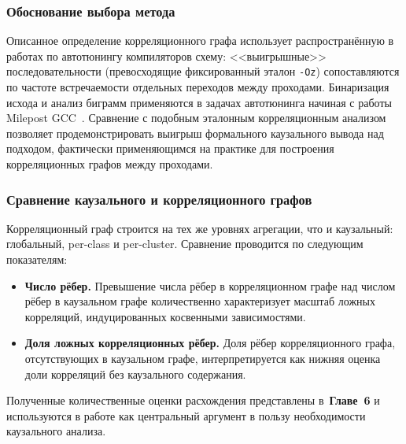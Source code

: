 \subsubsection{Обоснование выбора метода}

Описанное определение корреляционного графа использует распространённую в работах по автотюнингу компиляторов схему: <<выигрышные>> последовательности (превосходящие фиксированный эталон \texttt{-Oz}) сопоставляются по частоте встречаемости отдельных переходов между проходами. Бинаризация исхода и анализ биграмм применяются в задачах автотюнинга начиная с работы Milepost GCC~\cite{fursin2011milepost}. Сравнение с подобным эталонным корреляционным анализом позволяет продемонстрировать выигрыш формального каузального вывода над подходом, фактически применяющимся на практике для построения корреляционных графов между проходами.

\subsubsection{Сравнение каузального и корреляционного графов}

Корреляционный граф строится на тех же уровнях агрегации, что и каузальный: глобальный, per-class и per-cluster. Сравнение проводится по следующим показателям:

\begin{itemize}
    \item \textbf{Число рёбер.} Превышение числа рёбер в корреляционном графе над числом рёбер в каузальном графе количественно характеризует масштаб ложных корреляций, индуцированных косвенными зависимостями.
    \item \textbf{Доля ложных корреляционных рёбер.} Доля рёбер корреляционного графа, отсутствующих в каузальном графе, интерпретируется как нижняя оценка доли корреляций без каузального содержания.
\end{itemize}

Полученные количественные оценки расхождения представлены в~\textbf{Главе~6} и используются в работе как центральный аргумент в пользу необходимости каузального анализа.

\newpage
